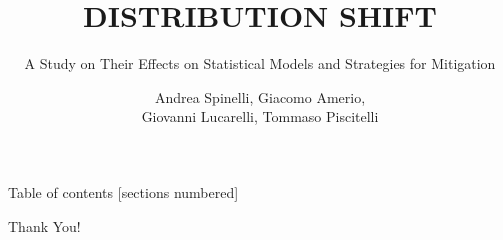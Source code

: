 \documentclass[11pt]{beamer}
\title{DISTRIBUTION SHIFT}
\subtitle{A Study on Their Effects on Statistical Models and Strategies for Mitigation}
\date{}
\author{Andrea Spinelli, Giacomo Amerio,\\Giovanni Lucarelli, Tommaso Piscitelli}
\institute{University of Trieste}
\begin{document}
\maketitle

\begin{frame}{Table of contents}
  [sections numbered]
  \tableofcontents%
\end{frame}






{
\begin{frame}[standout]
  \fontsize{18pt}{16pt}\selectfont
  Thank You!
\end{frame}
}

\appendix



%   
%   

\end{document}
